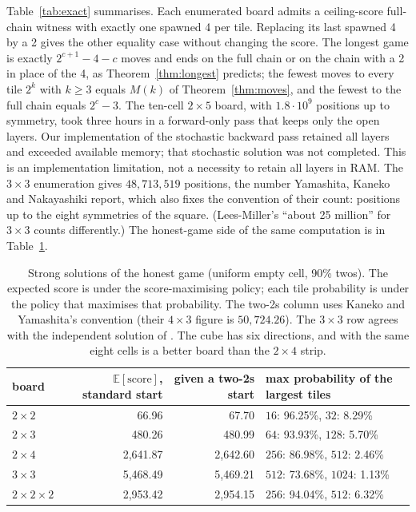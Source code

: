\documentclass[11pt]{article}
\theoremstyle{definition}
\theoremstyle{remark}
\begin{document}
Table~\ref{tab:exact} summarises. Each enumerated board admits a
ceiling-score full-chain witness with exactly one spawned 4 per tile.
Replacing its last spawned 4 by a 2 gives the other equality case without
changing the score. The longest game is exactly $2^{c+1}-4-c$ moves and ends on
the full chain or on the chain with a 2 in place of the 4, as
Theorem~\ref{thm:longest} predicts; the fewest moves to every tile $2^k$
with $k\ge3$ equals $M(k)$ of Theorem~\ref{thm:moves}, and the fewest to
the full chain equals $2^c-3$. The ten-cell $2\times5$ board, with
$1.8\cdot10^{9}$ positions up to symmetry, took three hours in a
forward-only pass that keeps only the open layers. Our implementation
of the stochastic backward pass retained all layers and exceeded available
memory; that stochastic solution was not completed. This is an
implementation limitation, not a necessity to retain all layers in RAM. The $3\times3$ enumeration gives
$48{,}713{,}519$ positions, the number Yamashita, Kaneko and Nakayashiki
report, which also fixes the convention of their count: positions up to
the eight symmetries of the square. (Lees-Miller's ``about 25 million''
for $3\times3$ counts differently.) The honest-game side of the same
computation is in Table~\ref{tab:honest}.

\begin{table}[t]
\centering\small
\begin{tabular}{@{}lrrl@{}}
\toprule
board & $\mathbb E[\text{score}]$, standard start & given a two-2s start & max probability of the largest tiles \\
\midrule
$2\times2$ & 66.96 & 67.70 & $16$: 96.25\%, \; $32$: 8.29\% \\
$2\times3$ & 480.26 & 480.99 & $64$: 93.93\%, \; $128$: 5.70\% \\
$2\times4$ & 2{,}641.87 & 2{,}642.60 & $256$: 86.98\%, \; $512$: 2.46\% \\
$3\times3$ & 5{,}468.49 & 5{,}469.21 & $512$: 73.68\%, \; $1024$: 1.13\% \\
$2\times2\times2$ & 2{,}953.42 & 2{,}954.15 & $256$: 94.04\%, \; $512$: 6.32\% \\
\bottomrule
\end{tabular}
\caption{Strong solutions of the honest game (uniform empty cell, 90\%
twos). The expected score is under the score-maximising policy; each tile
probability is under the policy that maximises that probability. The
two-2s column uses Kaneko and Yamashita's convention (their $4\times3$
figure is $50{,}724.26$). The $3\times3$ row agrees with the independent
solution of \cite{probabilitysports}. The cube has six directions, and
with the same eight cells is a better board than the $2\times4$ strip.}
\label{tab:honest}
\end{table}
\end{document}
